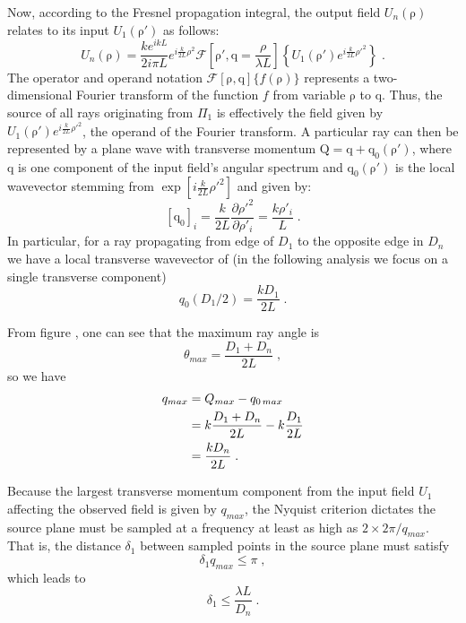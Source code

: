 \documentclass[12pt]{article}
\newcommand{\vect}[1]{\ensuremath{\boldsymbol{\mathrm{#1}}}}
\begin{document}
Now, according to the Fresnel propagation integral, the output field $U_n(\vect{\rho})$ relates to its input $U_1(\vect{\rho}')$ as follows:
\begin{equation}
U_n(\vect{\rho}) = \frac{k e^{ikL}}{2i\pi L} e^{i\frac{k}{2L}\rho^2} \mathcal F \left[\vect{\rho}', \vect{q}=\frac{\rho}{\lambda L} \right] \left\{ U_1(\vect{\rho}') e^{i\frac{k}{2L}\rho'^2} \right\} \; .
\end{equation}
The operator and operand notation $\mathcal F[\vect{\rho},\vect{q}]\{ f(\vect{\rho}) \}$ represents a two-dimensional Fourier transform of the function $f$ from variable $\vect{\rho}$ to $\vect{q}$. Thus, the source of all rays originating from $\Pi_1$ is effectively the field given by $U_1(\vect{\rho}') e^{i\frac{k}{2L}\rho'^2}$, the operand of the Fourier transform. A particular ray can then be represented by a plane wave with transverse momentum $\vect{Q} = \vect{q} + \vect{q}_0(\vect{\rho}')$, where $\vect{q}$ is one component of the input field's angular spectrum and $\vect{q}_0(\vect{\rho}')$ is the local wavevector stemming from $\exp \left[i\frac{k}{2L}\rho'^2\right]$ and given by:
\begin{equation}
\left[\vect{q}_{0}\right]_i = \frac{k}{2L} \frac{\partial \rho'^2}{\partial \rho'_i} = \frac{k\rho'_i}{L} \; .
\end{equation}
In particular, for a ray propagating from edge of $D_1$ to the opposite edge in $D_n$ we have a local transverse wavevector of (in the following analysis we focus on a single transverse component)
\begin{equation}
q_0\left(D_1/2\right) = \frac{kD_1}{2L} \; .
\end{equation}

From figure , one can see that the maximum ray angle is
\begin{equation}
\theta_{max} = \frac{D_1+D_n}{2L} \; ,
\end{equation}
so we have
\begin{align}
q_{max} &= Q_{max} - q_{0\,max} \notag \\
&= k\frac{D_1+D_n}{2L} - k\frac{D_1}{2L} \notag \\
&= \frac{k D_n}{2L} \; .
\end{align}

Because the largest transverse momentum component from the input field $U_1$ affecting the observed field is given by $q_{max}$, the Nyquist criterion dictates the source plane must be sampled at a frequency at least as high as $2\times 2\pi/q_{max}$. That is, the distance $\delta_1$ between sampled points in the source plane must satisfy
\begin{equation}
\delta_1 q_{max} \leq \pi \; ,
\end{equation}
which leads to
\begin{equation}
\delta_1 \leq \frac{\lambda L}{D_n} \; . \label{delta1}
\end{equation}
\end{document}
